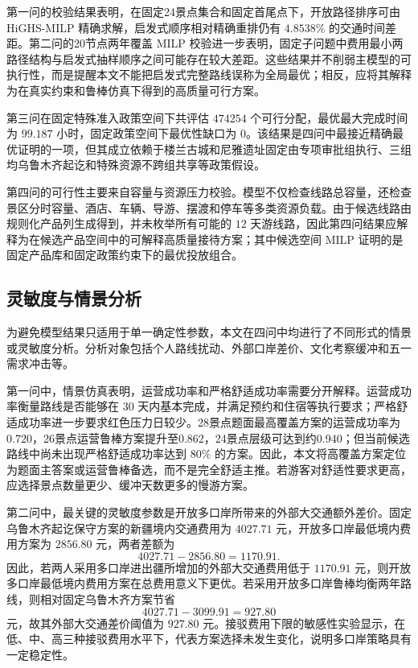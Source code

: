 \documentclass[UTF8,zihao=-4,a4paper]{ctexart}
\begin{document}
第一问的校验结果表明，在固定24景点集合和固定首尾点下，开放路径排序可由 HiGHS-MILP 精确求解，启发式顺序相对精确重排仍有 $4.8538\%$ 的交通时间差距。第二问的20节点两年覆盖 MILP 校验进一步表明，固定子问题中费用最小两路径结构与启发式抽样顺序之间可能存在较大差距。这些结果并不削弱主模型的可执行性，而是提醒本文不能把启发式完整路线误称为全局最优；相反，应将其解释为在真实约束和鲁棒仿真下得到的高质量可行方案。

第三问在固定特殊准入政策空间下共评估 $474254$ 个可行分配，最优最大完成时间为 $99.187$ 小时，固定政策空间下最优性缺口为 $0$。该结果是四问中最接近精确最优证明的一项，但其成立依赖于楼兰古城和尼雅遗址固定由专项审批组执行、三组均乌鲁木齐起讫和特殊资源不跨组共享等政策假设。

第四问的可行性主要来自容量与资源压力校验。模型不仅检查线路总容量，还检查景区分时容量、酒店、车辆、导游、摆渡和停车等多类资源负载。由于候选线路由规则化产品列生成得到，并未枚举所有可能的 $12$ 天游线路，因此第四问结果应解释为在候选产品空间中的可解释高质量接待方案；其中候选空间 MILP 证明的是固定产品库和固定政策约束下的最优投放组合。

\subsection{灵敏度与情景分析}
\label{subsec:sensitivity_scenario}

为避免模型结果只适用于单一确定性参数，本文在四问中均进行了不同形式的情景或灵敏度分析。分析对象包括个人路线扰动、外部口岸差价、文化考察缓冲和五一需求冲击等。

第一问中，情景仿真表明，运营成功率和严格舒适成功率需要分开解释。运营成功率衡量路线是否能够在 $30$ 天内基本完成，并满足预约和住宿等执行要求；严格舒适成功率进一步要求红色压力日较少。28景点题面最高覆盖方案的运营成功率为0.720，26景点运营鲁棒方案提升至0.862，24景点层级可达到约0.940；但当前候选路线中尚未出现严格舒适成功率达到 $80\%$ 的方案。因此，本文将高覆盖方案定位为题面主答案或运营鲁棒备选，而不是完全舒适主推。若游客对舒适性要求更高，应选择景点数量更少、缓冲天数更多的慢游方案。

第二问中，最关键的灵敏度参数是开放多口岸所带来的外部大交通额外差价。固定乌鲁木齐起讫保守方案的新疆境内交通费用为 $4027.71$ 元，开放多口岸最低境内费用方案为 $2856.80$ 元，两者差额为
\[
4027.71-2856.80=1170.91.
\]
因此，若两人采用多口岸进出疆所增加的外部大交通费用低于 $1170.91$ 元，则开放多口岸最低境内费用方案在总费用意义下更优。若采用开放多口岸鲁棒均衡两年路线，则相对固定乌鲁木齐方案节省
\[
4027.71-3099.91=927.80
\]
元，故其外部大交通差价阈值为 $927.80$ 元。接驳费用下限的敏感性实验显示，在低、中、高三种接驳费用水平下，代表方案选择未发生变化，说明多口岸策略具有一定稳定性。
\end{document}

